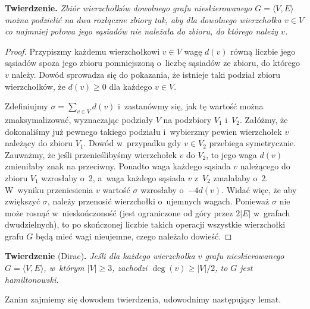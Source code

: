 \subproblem %
\textsf{\textbf{Twierdzenie.}} \textit{Zbiór wierzchołków dowolnego grafu nieskierowanego\/ $G=\langle V,E\rangle$ można podzielić na dwa rozłączne zbiory tak, aby dla dowolnego wierzchołka\/ $v\in V$ co najmniej połowa jego sąsiadów nie należała do zbioru, do którego należy\/ $v$.}
\begin{proof}
Przypiszmy każdemu wierzchołkowi $v\in V$ wagę $d(v)$ równą liczbie jego sąsiadów spoza jego zbioru pomniejszoną o~liczbę sąsiadów ze zbioru, do którego $v$ należy.
Dowód sprowadza się do pokazania, że istnieje taki podział zbioru wierzchołków, że $d(v)\ge0$ dla każdego $v\in V$\!.

Zdefiniujmy $\sigma=\sum_{v\in V}d(v)$ i~zastanówmy się, jak tę wartość można zmaksymalizować, wyznaczając podziały $V$ na podzbiory $V_1$ i~$V_2$.
Załóżmy, że dokonaliśmy już pewnego takiego podziału i~wybierzmy pewien wierzchołek $v$ należący do zbioru $V_1$.
Dowód w~przypadku gdy $v\in V_2$ przebiega symetrycznie.
Zauważmy, że jeśli przenieślibyśmy wierzchołek $v$ do $V_2$, to jego waga $d(v)$ zmieniłaby znak na przeciwny.
Ponadto waga każdego sąsiada $v$ należącego do zbioru $V_1$ wzrosłaby o~2, a~waga każdego sąsiada $v$ z~$V_2$ zmalałaby o~2.
W~wyniku przeniesienia $v$ wartość $\sigma$ wzrosłaby o~$-4d(v)$.
Widać więc, że aby zwiększyć $\sigma$, należy przenosić wierzchołki o~ujemnych wagach.
Ponieważ $\sigma$ nie może rosnąć w~nieskończoność (jest ograniczone od góry przez $2|E|$ w~grafach dwudzielnych), to po skończonej liczbie takich operacji wszystkie wierzchołki grafu $G$ będą mieć wagi nieujemne, czego należało dowieść.
\end{proof}

\subproblem %
\textsf{\textbf{Twierdzenie} (Dirac)\textbf{.}} \textit{Jeśli dla każdego wierzchołka\/ $v$ grafu nieskierowanego\/ $G=\langle V,E\rangle$, w~którym\/ $|V|\ge3$, zachodzi\/ $\deg(v)\ge|V|/2$, to\/ $G$ jest hamiltonowski.}

\medskip
\noindent Zanim zajmiemy się dowodem twierdzenia, udowodnimy następujący lemat.

